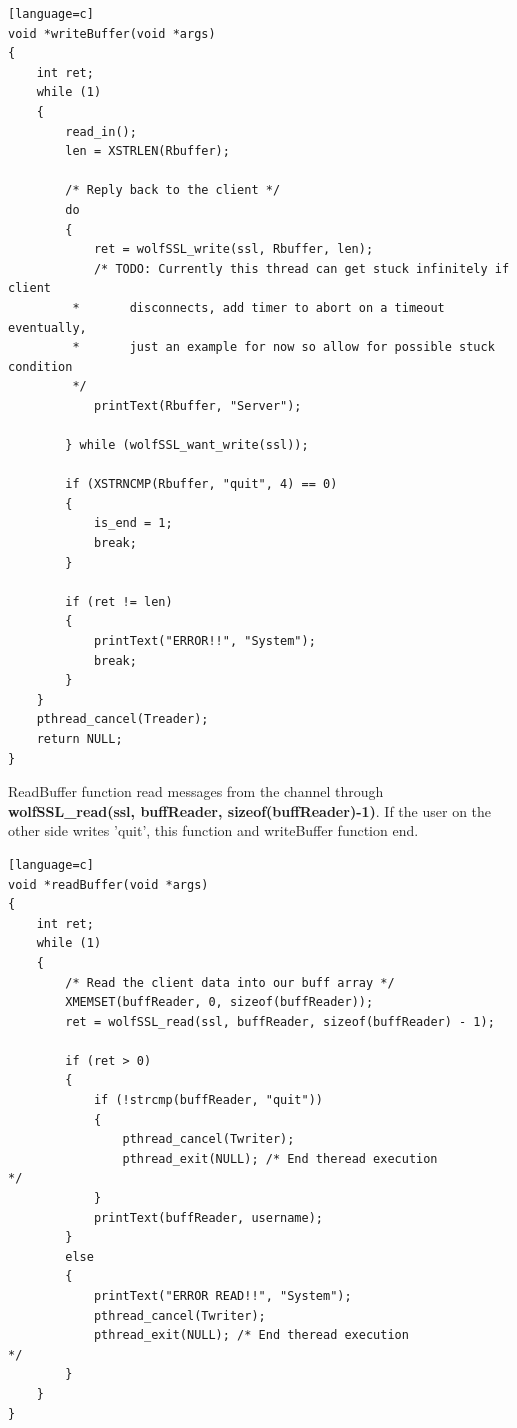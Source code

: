\documentclass[a4paper,12pt]{report}
\begin{document}
\begin{lstlisting}[caption={writeBuffer() of SSL server},captionpos=b][language=c]
void *writeBuffer(void *args)
{
    int ret;
    while (1)
    {
        read_in();
        len = XSTRLEN(Rbuffer);

        /* Reply back to the client */
        do
        {
            ret = wolfSSL_write(ssl, Rbuffer, len);
            /* TODO: Currently this thread can get stuck infinitely if client
         *       disconnects, add timer to abort on a timeout eventually,
         *       just an example for now so allow for possible stuck condition
         */
            printText(Rbuffer, "Server");

        } while (wolfSSL_want_write(ssl));

        if (XSTRNCMP(Rbuffer, "quit", 4) == 0)
        {
            is_end = 1;
            break;
        }

        if (ret != len)
        {
            printText("ERROR!!", "System");
            break;
        }
    }
    pthread_cancel(Treader);
    return NULL;
}
\end{lstlisting}
ReadBuffer function read messages from the channel through \textbf{wolfSSL\_read(ssl, buffReader, sizeof(buffReader)-1)}. If the user on the other side writes 'quit', this function and writeBuffer function end.
\begin{lstlisting}[caption={readBuffer() of SSL server},captionpos=b][language=c]
void *readBuffer(void *args)
{
    int ret;
    while (1)
    {
        /* Read the client data into our buff array */
        XMEMSET(buffReader, 0, sizeof(buffReader));
        ret = wolfSSL_read(ssl, buffReader, sizeof(buffReader) - 1);

        if (ret > 0)
        {
            if (!strcmp(buffReader, "quit"))
            {
                pthread_cancel(Twriter);
                pthread_exit(NULL); /* End theread execution                */
            }
            printText(buffReader, username);
        }
        else
        {
            printText("ERROR READ!!", "System");
            pthread_cancel(Twriter);
            pthread_exit(NULL); /* End theread execution                */
        }
    }
}
\end{lstlisting}
\pagebreak
\end{document}

